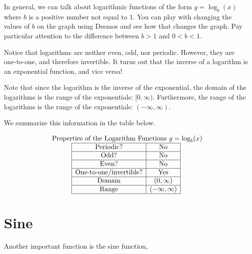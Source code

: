 \documentclass[nooutcomes]{ximera}
\begin{document}
In general, we can talk about logarithmic functions of the form $y=\log_b(x)$ where $b$ is a positive number not equal to $1$.  You can play with changing the values of $b$ on the graph using Desmos and see how that changes the graph.  Pay particular attention to the difference between $b > 1$ and $0 < b < 1$.
 
\begin{center} 
\end{center}
 
Notice that logarithms are neither even, odd, nor periodic. However, they are one-to-one, and therefore invertible. It turns out that the inverse of a logarithm is an exponential function, and vice versa!
 
Note that since the logarithm is the inverse of the exponential, the domain of the logarithms is the range of the exponentials: $[0, \infty)$. Furthermore, the range of the logarithms is the range of the exponentials: $(-\infty, \infty)$.
 
We summarize this information in the table below.
 
\[
\begin{array}{ c  }
  \text{ Properties of the Logarithm Functions } y=\log_b(x)\\
 \begin{array}{|c|c|}
 \hline
\text{Periodic?} & \text{No} \\ \hline
\text{Odd?} & \text{No} \\ \hline
\text{Even?} & \text{No} \\ \hline
\text{One-to-one/invertible?} & \text{Yes} \\ \hline
\text{Domain} & (0,\infty)\\ \hline
\text{Range} & (-\infty,\infty)\\ \hline
 \end{array}
\end{array}
 \]
 
 
\newpage
 
 
\section{Sine}
Another important function is the sine function,
 
\begin{center}
\end{center}
 
\end{document}
